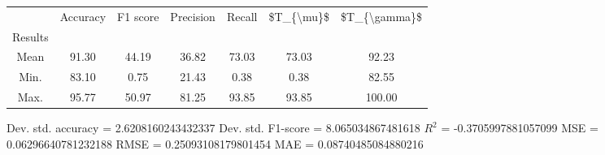 \begin{tabular}{|c|c|c|c|c|c|c|}
\toprule
{} &  Accuracy &  F1 score &  Precision &  Recall &  \$T\_\{\textbackslash mu\}\$ &  \$T\_\{\textbackslash gamma\}\$ \\
Results &           &           &            &         &            &               \\
\hline
Mean    &     91.30 &     44.19 &      36.82 &   73.03 &      73.03 &         92.23 \\
Min.    &     83.10 &      0.75 &      21.43 &    0.38 &       0.38 &         82.55 \\
Max.    &     95.77 &     50.97 &      81.25 &   93.85 &      93.85 &        100.00 \\
\bottomrule
\end{tabular}

 Dev. std. accuracy = 2.6208160243432337
 Dev. std. F1-score = 8.065034867481618
 $R^2$ = -0.3705997881057099
 MSE = 0.06296640781232188
 RMSE = 0.25093108179801454
 MAE = 0.08740485084880216